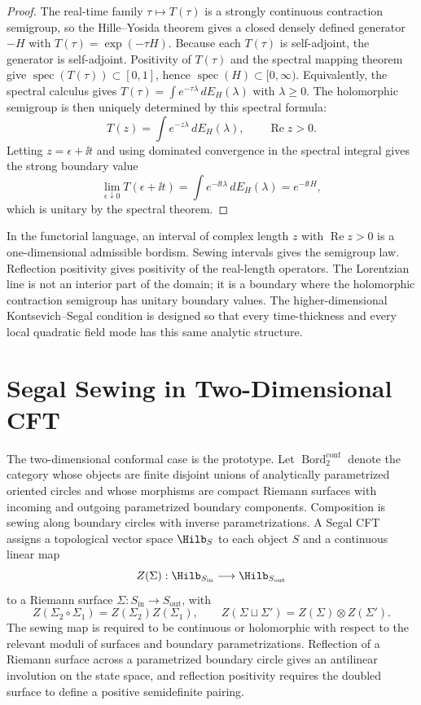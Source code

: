 \begin{proof}
The real-time family \(\tau\mapsto T(\tau)\) is a strongly continuous
contraction semigroup, so the Hille--Yosida theorem gives a closed densely
defined generator \(-H\) with \(T(\tau)=\exp(-\tau H)\).  Because each
\(T(\tau)\) is self-adjoint, the generator is self-adjoint.  Positivity of
\(T(\tau)\) and the spectral mapping theorem give
\(\operatorname{spec}(T(\tau))\subset[0,1]\), hence
\(\operatorname{spec}(H)\subset[0,\infty)\).  Equivalently, the spectral
calculus gives \(T(\tau)=\int e^{-\tau\lambda}\,dE_H(\lambda)\) with
\(\lambda\ge0\).  The holomorphic semigroup is then uniquely determined by
this spectral formula:
\[
  T(z)=\int e^{-z\lambda}\,dE_H(\lambda),
  \qquad \operatorname{Re}z>0.
\]
Letting \(z=\epsilon+\ii t\) and using dominated convergence in the spectral
integral gives the strong boundary value
\[
  \lim_{\epsilon\downarrow0}T(\epsilon+\ii t)
  =
  \int e^{-\ii t\lambda}\,dE_H(\lambda)
  =
  e^{-\ii tH},
\]
which is unitary by the spectral theorem.
\end{proof}

In the functorial language, an interval of complex length \(z\) with
\(\operatorname{Re}z>0\) is a one-dimensional admissible bordism.  Sewing
intervals gives the semigroup law.  Reflection positivity gives positivity of
the real-length operators.  The Lorentzian line is not an interior part of
the domain; it is a boundary where the holomorphic contraction semigroup has
unitary boundary values.  The higher-dimensional Kontsevich--Segal condition
is designed so that every time-thickness and every local quadratic field
mode has this same analytic structure.

\section{Segal Sewing in Two-Dimensional CFT}

The two-dimensional conformal case is the prototype.  Let
\(\operatorname{Bord}^{\mathrm{conf}}_2\) denote the category whose objects
are finite disjoint unions of analytically parametrized oriented circles and
whose morphisms are compact Riemann surfaces with incoming and outgoing
parametrized boundary components.  Composition is sewing along boundary
circles with inverse parametrizations.  A Segal CFT assigns a topological
vector space \(\Hilb_{S}\) to each object \(S\) and a continuous linear map
\[
  Z(\Sigma):\Hilb_{S_{\mathrm{in}}}\longrightarrow
  \Hilb_{S_{\mathrm{out}}}
\]
to a Riemann surface \(\Sigma:S_{\mathrm{in}}\to S_{\mathrm{out}}\), with
\[
  Z(\Sigma_2\circ\Sigma_1)=Z(\Sigma_2)Z(\Sigma_1),
  \qquad
  Z(\Sigma\sqcup\Sigma')=Z(\Sigma)\otimes Z(\Sigma').
\]
The sewing map is required to be continuous or holomorphic with respect to
the relevant moduli of surfaces and boundary parametrizations.  Reflection of
a Riemann surface across a parametrized boundary circle gives an antilinear
involution on the state space, and reflection positivity requires the doubled
surface to define a positive semidefinite pairing.

